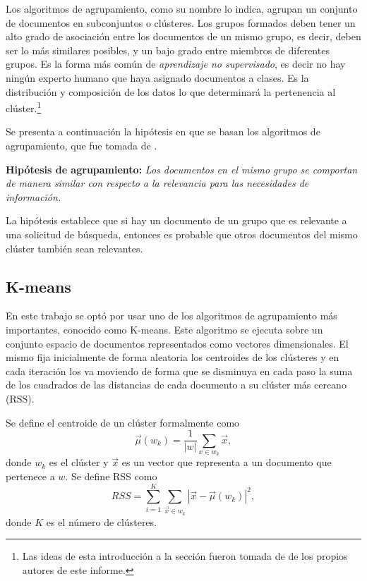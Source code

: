 \documentclass{llncs}
\begin{document}
	Los algoritmos de agrupamiento, como su nombre lo indica, agrupan un conjunto de documentos en subconjuntos o clústeres. Los grupos formados deben tener un alto grado de asociación entre los documentos de un mismo grupo, es decir, deben ser lo m\'as similares posibles, y un bajo grado entre miembros de diferentes grupos. Es la forma más común de \textit{aprendizaje no supervisado}, es decir no hay ningún experto humano que haya asignado documentos a clases. Es la distribución y composición de los datos lo que determinará la pertenencia al clúster.\footnote{Las ideas de esta introducci\'on a la secci\'on fueron tomada de \cite{B6} de los propios autores de este informe.}
	
	Se presenta a continuaci\'on la hip\'otesis en que se basan los algoritmos de agrupamiento, que fue tomada de \cite[Secci\'on 16.1]{B1}.
	
	\vspace{1em}
	\textbf{Hip\'otesis de agrupamiento:} \textit{Los documentos en el mismo grupo se comportan de manera similar con respecto a la relevancia para las necesidades de información.}
	
	\vspace{0.3em}
	La hipótesis establece que si hay un documento de un grupo que es relevante a una solicitud de búsqueda, entonces es probable que otros documentos del mismo clúster también sean relevantes. 
	\vspace{1em}
	
	\subsection{K-means}
		En este trabajo se opt\'o por usar uno de los algoritmos de agrupamiento m\'as importantes, conocido como K-means. Este algoritmo se ejecuta sobre un conjunto espacio de documentos representados como vectores dimensionales. El mismo fija inicialmente de forma aleatoria los centroides de los cl\'usteres y en cada iteraci\'on los va moviendo de forma que se disminuya en cada paso la suma de los cuadrados de las distancias de cada documento a su cl\'uster m\'as cercano (RSS).
		
		Se define el centroide de un cl\'uster formalmente como 
		\[
		\overrightarrow{\mu}(w_k) = \frac{1}{|w|}\sum_{x \in w_k} \overrightarrow{x},
		\]
		donde $w_k$ es el cl\'uster y $\overrightarrow{x}$ es un vector que representa a un documento que pertenece a $w$. Se define RSS como 
		\[
			RSS = \sum_{i = 1}^K \sum_{\overrightarrow{x} \in w_k} |\overrightarrow{x} - \overrightarrow{\mu}(w_k)|^2,
		\]
		donde $K$ es el n\'umero de cl\'usteres.
	
\end{document}
